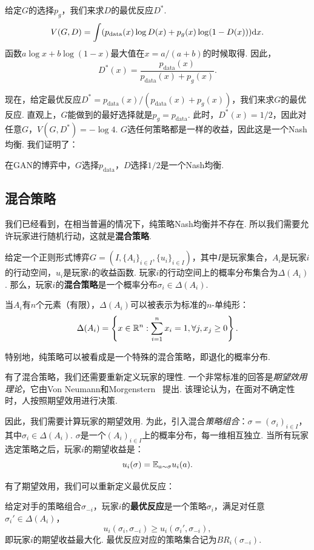 给定$G$的选择$p_g$，我们来求$D$的最优反应$D^*$.
    \[V(G,D)=\int (p_{\text{data}}(x)\log D(x)+p_g(x)\log(1-D(x)))\mathrm{d} x.\]
函数$a\log x+b\log(1-x)$最大值在$x=a/(a+b)$的时候取得. 因此，
    \[D^*(x)=\frac{p_{\text{data}}(x)}{p_{\text{data}}(x)+p_g(x)}.\]
    
现在，给定最优反应$D^*=p_{\text{data}}(x)/(p_{\text{data}}(x)+p_g(x))$，我们来求$G$的最优反应. 直观上，$G$能做到的最好选择就是$p_g=p_{\text{data}}$. 此时，$D^*(x)=1/2$，因此对任意$G$，$V(G,D^*)=-\log 4$. $G$选任何策略都是一样的收益，因此这是一个Nash均衡. 我们证明了：
\begin{theorem}[GAN的Nash均衡存在性]
在GAN的博弈中，$G$选择$p_{\text{data}}$，$D$选择$1/2$是一个Nash均衡.
\end{theorem}

\subsection{混合策略}\label{sec:mixed-strategy}
我们已经看到，在相当普遍的情况下，纯策略Nash均衡并不存在. 所以我们需要允许玩家进行随机行动，这就是\textbf{混合策略}. 

\begin{definition}[混合策略]
给定一个正则形式博弈$G=(I,\{A_i\}_{i\in I},\{u_i\}_{i\in I})$，其中$I$是玩家集合，$A_i$是玩家$i$的行动空间，$u_i$是玩家$i$的收益函数. 玩家$i$的行动空间上的概率分布集合为$\Delta(A_i)$. 那么，玩家$i$的\textbf{混合策略}是一个概率分布$\sigma_i\in\Delta(A_i)$. 
\end{definition}

当$A_i$有$n$个元素（有限），$\Delta(A_i)$可以被表示为标准的$n$-单纯形：
    \[\Delta(A_i)=\left\{x\in\mathbb{R}^n:\sum_{i=1}^n x_i=1,\forall j,x_j\geq 0\right\}.\]

特别地，纯策略可以被看成是一个特殊的混合策略，即退化的概率分布.

有了混合策略，我们还需要重新定义玩家的理性. 一个非常标准的回答是\textit{期望效用理论}，它由Von Neumann和Morgenstern~\cite{vonneumannTheoryGamesEconomic2007} 提出. 该理论认为，在面对不确定性时，人按照期望效用进行决策. 

因此，我们需要计算玩家的期望效用. 为此，引入混合\textit{策略组合}：$\sigma=(\sigma_i)_{i\in I}$，其中$\sigma_i\in\Delta(A_i)$. $\sigma$是一个$(A_i)_{i\in I}$上的概率分布，每一维相互独立. 当所有玩家选定策略之后，玩家$i$的期望收益是：
    \[u_i(\sigma)=\mathbb{E}_{a\sim\sigma} u_i(a).\]

有了期望效用，我们可以重新定义最优反应：

\begin{definition}[最优反应]
给定对手的策略组合$\sigma_{-i}$，玩家$i$的\textbf{最优反应}是一个策略$\sigma_i$，满足对任意$\sigma_i'\in \Delta(A_i)$，
    \[u_i(\sigma_i,\sigma_{-i})\geq u_i(\sigma_i',\sigma_{-i}),\]
即玩家$i$的期望收益最大化. 最优反应对应的策略集合记为$BR_i(\sigma_{-i})$.
\end{definition}

